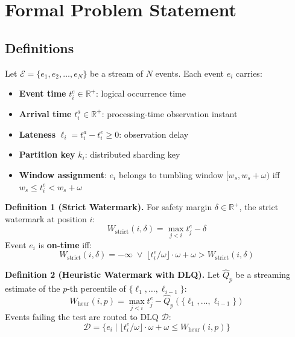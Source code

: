 \documentclass[11pt,a4paper]{article}
\newcommand{\eventtime}{t^{e}}
\newcommand{\arrivaltime}{t^{a}}
\newcommand{\lateness}{\ell}
\begin{document}
\section{Formal Problem Statement}

\subsection{Definitions}

Let $\mathcal{E} = \{e_1, e_2, \ldots, e_N\}$ be a stream of $N$ events. Each event $e_i$ carries:

\begin{itemize}[leftmargin=*, itemsep=1pt]
  \item \textbf{Event time} $\eventtime_i \in \mathbb{R}^+$: logical occurrence time
  \item \textbf{Arrival time} $\arrivaltime_i \in \mathbb{R}^+$: processing-time observation instant
  \item \textbf{Lateness} $\lateness_i = \arrivaltime_i - \eventtime_i \geq 0$: observation delay
  \item \textbf{Partition key} $k_i$: distributed sharding key
  \item \textbf{Window assignment}: $e_i$ belongs to tumbling window $[w_s, w_s + \omega)$ iff $w_s \leq \eventtime_i < w_s + \omega$
\end{itemize}

\vspace{4pt}
\noindent\textbf{Definition 1 (Strict Watermark).}
For safety margin $\delta \in \mathbb{R}^+$, the strict watermark at position $i$:
\begin{equation}
  W_{\text{strict}}(i, \delta) = \max_{j < i} \eventtime_j - \delta
  \label{eq:strict}
\end{equation}
Event $e_i$ is \textbf{on-time} iff:
\begin{equation}
  W_{\text{strict}}(i, \delta) = -\infty \;\lor\; \big\lfloor \eventtime_i / \omega \big\rfloor \cdot \omega + \omega > W_{\text{strict}}(i, \delta)
  \label{eq:strict-test}
\end{equation}

\vspace{4pt}
\noindent\textbf{Definition 2 (Heuristic Watermark with DLQ).}
Let $\hat{Q}_p$ be a streaming estimate of the $p$-th percentile of $\{\lateness_1, \ldots, \lateness_{i-1}\}$:
\begin{equation}
  W_{\text{heur}}(i, p) = \max_{j < i} \eventtime_j - \hat{Q}_p(\{\lateness_1, \ldots, \lateness_{i-1}\})
  \label{eq:heuristic}
\end{equation}
Events failing the test are routed to DLQ $\mathcal{D}$:
\begin{equation}
  \mathcal{D} = \big\{ e_i \mid \lfloor \eventtime_i / \omega \rfloor \cdot \omega + \omega \leq W_{\text{heur}}(i, p) \big\}
  \label{eq:dlq}
\end{equation}
\end{document}

